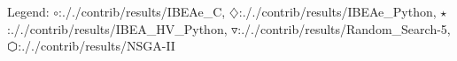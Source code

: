 Legend: {\color{NavyBlue}$\circ$}:././contrib/results/IBEAe\_C, {\color{Magenta}$\diamondsuit$}:././contrib/results/IBEAe\_Python, {\color{Orange}$\star$}:././contrib/results/IBEA\_HV\_Python, {\color{CornflowerBlue}$\triangledown$}:././contrib/results/Random\_Search-5, {\color{red}$\varhexagon$}:././contrib/results/NSGA-II